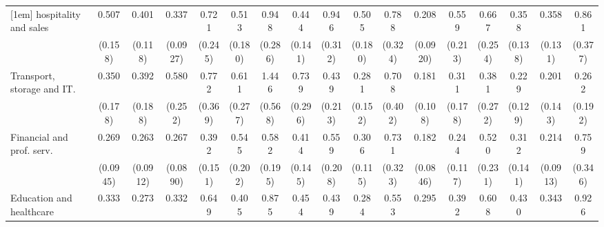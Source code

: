 {\begin{tabular}{l*{16}{c}}
[1em]
hospitality and sales&       0.507\sym{*}  &       0.401\sym{**} &       0.337\sym{***}&       0.721         &       0.513         &       0.948         &       0.444\sym{*}  &       0.946         &       0.505         &       0.788         &       0.208\sym{***}&       0.559         &       0.667         &       0.358\sym{**} &       0.358\sym{**} &       0.861         \\
                    &     (0.158)         &     (0.118)         &    (0.0927)         &     (0.245)         &     (0.180)         &     (0.286)         &     (0.141)         &     (0.312)         &     (0.180)         &     (0.324)         &    (0.0920)         &     (0.213)         &     (0.254)         &     (0.138)         &     (0.131)         &     (0.377)         \\
[1em]
Transport, storage and IT.&       0.350\sym{*}  &       0.392         &       0.580         &       0.772         &       0.611         &       1.446         &       0.739         &       0.439         &       0.281\sym{*}  &       0.708         &       0.181\sym{**} &       0.311\sym{*}  &       0.381         &       0.229\sym{**} &       0.201\sym{*}  &       0.262         \\
                    &     (0.178)         &     (0.188)         &     (0.252)         &     (0.369)         &     (0.277)         &     (0.568)         &     (0.296)         &     (0.213)         &     (0.152)         &     (0.402)         &     (0.108)         &     (0.178)         &     (0.272)         &     (0.129)         &     (0.143)         &     (0.192)         \\
[1em]
Financial and prof. serv.&       0.269\sym{***}&       0.263\sym{***}&       0.267\sym{***}&       0.392\sym{*}  &       0.545         &       0.582         &       0.414\sym{*}  &       0.559         &       0.306\sym{**} &       0.731         &       0.182\sym{***}&       0.244\sym{**} &       0.520         &       0.312\sym{**} &       0.214\sym{***}&       0.759         \\
                    &    (0.0945)         &    (0.0912)         &    (0.0890)         &     (0.151)         &     (0.202)         &     (0.195)         &     (0.145)         &     (0.208)         &     (0.115)         &     (0.323)         &    (0.0846)         &     (0.117)         &     (0.231)         &     (0.141)         &    (0.0913)         &     (0.346)         \\
[1em]
Education and healthcare&       0.333\sym{**} &       0.273\sym{***}&       0.332\sym{***}&       0.649         &       0.405\sym{*}  &       0.875         &       0.454\sym{*}  &       0.439\sym{*}  &       0.284\sym{***}&       0.553         &       0.295\sym{**} &       0.392\sym{*}  &       0.608         &       0.430\sym{*}  &       0.343\sym{**} &       0.926         \\

\end{tabular}}
